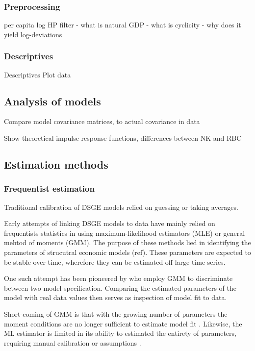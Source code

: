 \documentclass[11pt,a4paper,english]{article} %
\begin{document}
	\subsubsection{Preprocessing}
	per capita
	log
	HP filter
	- what is natural GDP
	- what is cyclicity
	- why does it yield log-deviations
	\subsubsection{Descriptives}
	Descriptives
	Plot data
	
	\subsection{Analysis of models}
	Compare model covariance matrices, to actual covariance in data
	
	Show theoretical impulse response functions, differences between NK and RBC
	
	
	\subsection{Estimation methods}
	
	\subsubsection{Frequentist estimation}
	Traditional calibration of DSGE models relied on guessing or taking averages.
	
	Early attempts of linking DSGE models to data have mainly relied on frequentists statistics in using maximum-likelihood estimators (MLE) or general mehtod of moments (GMM).
	The purpose of these methods lied in identifying the parameters of strucutral economic models (ref). These parameters are expected to be stable over time, wherefore they can be estimated off large time series. 
	
	One such attempt has been pioneered by \cite{christiano_current_1992} who employ GMM to discriminate between two model specification. Comparing the estimated parameters of the model with real data values then serves as inspection of model fit to data.
	
	Short-coming of GMM is that with the growing number of parameters the moment conditions are no longer sufficient to estimate model fit \cite{quintana_bayesian_nodate}. Likewise, the ML estimator is limited in its ability to estimated the entirety of parameters, requiring manual calibration or assumptions \cite{quintana_bayesian_nodate}.
	
\end{document}
